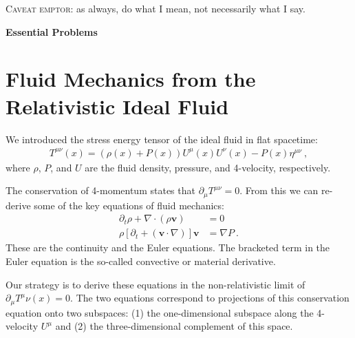 \documentclass[12pt]{article}
\numberwithin{equation}{section}    %
\renewcommand{\vec}[1]{\mathbf{#1}} %
\begin{document}

%

\textsc{Caveat emptor}: as always, do what I mean, not necessarily what I say.


\vspace{2em}
{\Large\textbf{\textsf{Essential Problems}}}

\section{Fluid Mechanics from the Relativistic Ideal Fluid}

We introduced the stress energy tensor of the ideal fluid in flat spacetime:
\begin{align}
	T^{\mu\nu}(x) = \left(\rho(x) + P(x)\right)U^\mu(x)U^\nu(x) - P(x) \eta^{\mu\nu} \ ,
\end{align}
where $\rho$, $P$, and $U$ are the fluid density, pressure, and 4-velocity, respectively.


The conservation of 4-momentum states that $\partial_\mu T^{\mu\nu} = 0$. From this we can re-derive some of the key equations of fluid mechanics: 
\begin{align}
	\partial_t \rho + \nabla\cdot(\rho \vec v) &=0 \\
	\rho\left[\partial_t + (\vec v \cdot \nabla) \right]\vec v
	&= \nabla P \ .
\end{align}
These are the continuity and the Euler equations. The bracketed term in the Euler equation is the so-called convective or material derivative. 

Our strategy is to derive these equations in the non-relativistic limit of $\partial_\mu T^\mu\nu(x) = 0$. The two equations correspond to projections of this conservation equation onto two subspaces: (1) the one-dimensional subspace along the 4-velocity $U^\mu$ and (2) the three-dimensional complement of this space.
\end{document}
